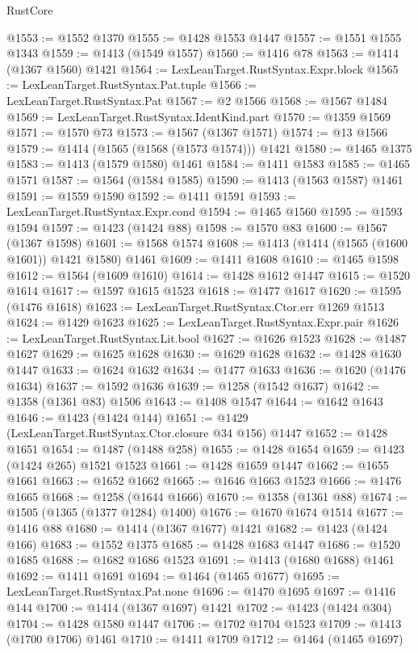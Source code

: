 \begin{lexlean}{RustCore}
\begin{coremodule}
@1553 := @1552 @1370
@1555 := @1428 @1553 @1447
@1557 := @1551 @1555 @1343
@1559 := @1413 (@1549 @1557)
@1560 := @1416 @78
@1563 := @1414 (@1367 @1560) @1421
@1564 := LexLeanTarget.RustSyntax.Expr.block
@1565 := LexLeanTarget.RustSyntax.Pat.tuple
@1566 := LexLeanTarget.RustSyntax.Pat
@1567 := @2 @1566
@1568 := @1567 @1484
@1569 := LexLeanTarget.RustSyntax.IdentKind.part
@1570 := @1359 @1569
@1571 := @1570 @73
@1573 := @1567 (@1367 @1571)
@1574 := @13 @1566
@1579 := @1414 (@1565 (@1568 (@1573 @1574))) @1421
@1580 := @1465 @1375
@1583 := @1413 (@1579 @1580) @1461
@1584 := @1411 @1583
@1585 := @1465 @1571
@1587 := @1564 (@1584 @1585)
@1590 := @1413 (@1563 @1587) @1461
@1591 := @1559 @1590
@1592 := @1411 @1591
@1593 := LexLeanTarget.RustSyntax.Expr.cond
@1594 := @1465 @1560
@1595 := @1593 @1594
@1597 := @1423 (@1424 @88)
@1598 := @1570 @83
@1600 := @1567 (@1367 @1598)
@1601 := @1568 @1574
@1608 := @1413 (@1414 (@1565 (@1600 @1601)) @1421 @1580) @1461
@1609 := @1411 @1608
@1610 := @1465 @1598
@1612 := @1564 (@1609 @1610)
@1614 := @1428 @1612 @1447
@1615 := @1520 @1614
@1617 := @1597 @1615 @1523
@1618 := @1477 @1617
@1620 := @1595 (@1476 @1618)
@1623 := LexLeanTarget.RustSyntax.Ctor.err @1269 @1513
@1624 := @1429 @1623
@1625 := LexLeanTarget.RustSyntax.Expr.pair
@1626 := LexLeanTarget.RustSyntax.Lit.bool
@1627 := @1626 @1523
@1628 := @1487 @1627
@1629 := @1625 @1628
@1630 := @1629 @1628
@1632 := @1428 @1630 @1447
@1633 := @1624 @1632
@1634 := @1477 @1633
@1636 := @1620 (@1476 @1634)
@1637 := @1592 @1636
@1639 := @1258 (@1542 @1637)
@1642 := @1358 (@1361 @83) @1506
@1643 := @1408 @1547
@1644 := @1642 @1643
@1646 := @1423 (@1424 @144)
@1651 := @1429 (LexLeanTarget.RustSyntax.Ctor.closure @34 @156) @1447
@1652 := @1428 @1651
@1654 := @1487 (@1488 @258)
@1655 := @1428 @1654
@1659 := @1423 (@1424 @265) @1521 @1523
@1661 := @1428 @1659 @1447
@1662 := @1655 @1661
@1663 := @1652 @1662
@1665 := @1646 @1663 @1523
@1666 := @1476 @1665
@1668 := @1258 (@1644 @1666)
@1670 := @1358 (@1361 @88)
@1674 := @1505 (@1365 (@1377 @1284) @1400)
@1676 := @1670 @1674 @1514
@1677 := @1416 @88
@1680 := @1414 (@1367 @1677) @1421
@1682 := @1423 (@1424 @166)
@1683 := @1552 @1375
@1685 := @1428 @1683 @1447
@1686 := @1520 @1685
@1688 := @1682 @1686 @1523
@1691 := @1413 (@1680 @1688) @1461
@1692 := @1411 @1691
@1694 := @1464 (@1465 @1677)
@1695 := LexLeanTarget.RustSyntax.Pat.none
@1696 := @1470 @1695
@1697 := @1416 @144
@1700 := @1414 (@1367 @1697) @1421
@1702 := @1423 (@1424 @304)
@1704 := @1428 @1580 @1447
@1706 := @1702 @1704 @1523
@1709 := @1413 (@1700 @1706) @1461
@1710 := @1411 @1709
@1712 := @1464 (@1465 @1697)

\end{coremodule}
\end{lexlean}
